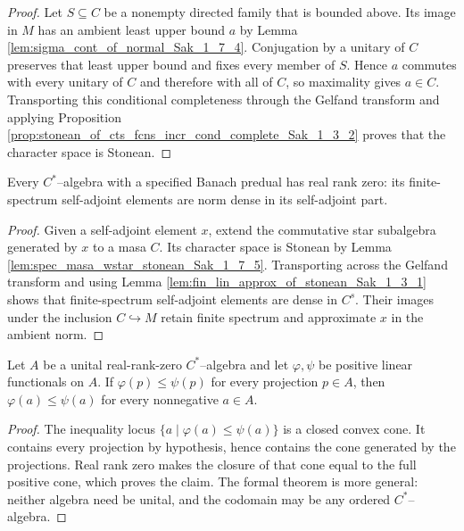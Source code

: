 \begin{proof}
  \leanok
  Let $S\subseteq C$ be a nonempty directed family that is bounded above. Its image in $M$ has
  an ambient least upper bound $a$ by Lemma \ref{lem:sigma_cont_of_normal_Sak_1_7_4}. Conjugation
  by a unitary of $C$ preserves that least upper bound and fixes every member of $S$. Hence $a$
  commutes with every unitary of $C$ and therefore with all of $C$, so maximality gives $a\in C$.
  Transporting this conditional completeness through the Gelfand transform and applying
  Proposition \ref{prop:stonean_of_cts_fcns_incr_cond_complete_Sak_1_3_2} proves that the character
  space is Stonean.
\end{proof}

\begin{theorem}
  \label{thm:real_rank_zero_of_predual}
  \leanok
  Every $C^{*}$--algebra with a specified Banach predual has real rank zero: its finite-spectrum
  self-adjoint elements are norm dense in its self-adjoint part.
\end{theorem}

\begin{proof}
  \leanok
  Given a self-adjoint element $x$, extend the commutative star subalgebra generated by $x$ to a
  masa $C$. Its character space is Stonean by Lemma
  \ref{lem:spec_masa_wstar_stonean_Sak_1_7_5}. Transporting across the Gelfand transform and using
  Lemma \ref{lem:fin_lin_approx_of_stonean_Sak_1_3_1} shows that finite-spectrum self-adjoint
  elements are dense in $C^{s}$. Their images under the inclusion $C\hookrightarrow M$ retain
  finite spectrum and approximate $x$ in the ambient norm.
\end{proof}

\begin{corollary}
  \label{cor:positive_functional_le_of_projection_le}
  \leanok
  Let $A$ be a unital real-rank-zero $C^{*}$--algebra and let $\varphi,\psi$ be positive linear
  functionals on $A$. If $\varphi(p)\le\psi(p)$ for every projection $p\in A$, then
  $\varphi(a)\le\psi(a)$ for every nonnegative $a\in A$.
\end{corollary}

\begin{proof}
  \leanok
  The inequality locus $\{a\mid\varphi(a)\le\psi(a)\}$ is a closed convex cone. It contains every
  projection by hypothesis, hence contains the cone generated by the projections. Real rank zero
  makes the closure of that cone equal to the full positive cone, which proves the claim. The
  formal theorem is more general: neither algebra need be unital, and the codomain may be any
  ordered $C^{*}$--algebra.
\end{proof}
